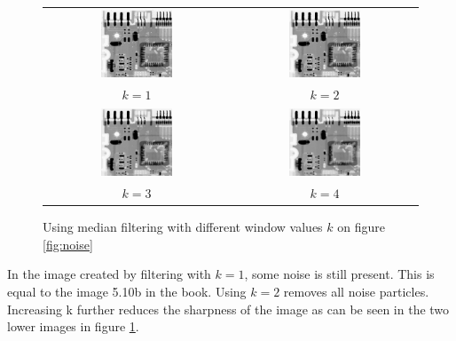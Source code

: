 \documentclass[a4paper]{article}
\begin{document}
\begin{enumerate}
\begin{figure}[H]
\centering
\begin{tabular}{cc}
    \includegraphics[width=0.4\textwidth]{../lab2ex3/restored1.png} &
    \includegraphics[width=0.4\textwidth]{../lab2ex3/restored2.png}\\
    $k = 1$ & $k = 2$ \\
    \includegraphics[width=0.4\textwidth]{../lab2ex3/restored3.png} &
    \includegraphics[width=0.4\textwidth]{../lab2ex3/restored4.png}\\
    $k = 3$ & $k = 4$
    
\end{tabular}
\caption{Using median filtering with different window values $k$ on figure \ref{fig:noise}} 
\label{fig:restored}
\end{figure}
In the image created by filtering with $k=1$, some noise is still present.
This is equal to the image 5.10b in the book. Using $k=2$ removes all noise particles.
Increasing k further reduces the sharpness of the image as can be seen in the two lower 
images in figure \ref{fig:restored}.
\end{enumerate}
\end{document}
